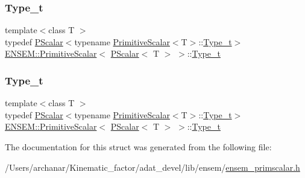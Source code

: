 \subsubsection{\texorpdfstring{Type\_t}{Type\_t}\hspace{0.1cm}{\footnotesize\ttfamily [1/2]}}
{\footnotesize\ttfamily template$<$class T $>$ \\
typedef \mbox{\hyperlink{classENSEM_1_1PScalar}{P\+Scalar}}$<$typename \mbox{\hyperlink{structENSEM_1_1PrimitiveScalar}{Primitive\+Scalar}}$<$T$>$\+::\mbox{\hyperlink{structENSEM_1_1PrimitiveScalar_3_01PScalar_3_01T_01_4_01_4_a3b7d612e567079b69a727ff98d74563e}{Type\+\_\+t}}$>$ \mbox{\hyperlink{structENSEM_1_1PrimitiveScalar}{E\+N\+S\+E\+M\+::\+Primitive\+Scalar}}$<$ \mbox{\hyperlink{classENSEM_1_1PScalar}{P\+Scalar}}$<$ T $>$ $>$\+::\mbox{\hyperlink{structENSEM_1_1PrimitiveScalar_3_01PScalar_3_01T_01_4_01_4_a3b7d612e567079b69a727ff98d74563e}{Type\+\_\+t}}}

\mbox{\label{structENSEM_1_1PrimitiveScalar_3_01PScalar_3_01T_01_4_01_4_a3b7d612e567079b69a727ff98d74563e}} 
\subsubsection{\texorpdfstring{Type\_t}{Type\_t}\hspace{0.1cm}{\footnotesize\ttfamily [2/2]}}
{\footnotesize\ttfamily template$<$class T $>$ \\
typedef \mbox{\hyperlink{classENSEM_1_1PScalar}{P\+Scalar}}$<$typename \mbox{\hyperlink{structENSEM_1_1PrimitiveScalar}{Primitive\+Scalar}}$<$T$>$\+::\mbox{\hyperlink{structENSEM_1_1PrimitiveScalar_3_01PScalar_3_01T_01_4_01_4_a3b7d612e567079b69a727ff98d74563e}{Type\+\_\+t}}$>$ \mbox{\hyperlink{structENSEM_1_1PrimitiveScalar}{E\+N\+S\+E\+M\+::\+Primitive\+Scalar}}$<$ \mbox{\hyperlink{classENSEM_1_1PScalar}{P\+Scalar}}$<$ T $>$ $>$\+::\mbox{\hyperlink{structENSEM_1_1PrimitiveScalar_3_01PScalar_3_01T_01_4_01_4_a3b7d612e567079b69a727ff98d74563e}{Type\+\_\+t}}}



The documentation for this struct was generated from the following file\+:\begin{DoxyCompactItemize}
\item 
/\+Users/archanar/\+Kinematic\+\_\+factor/adat\+\_\+devel/lib/ensem/\mbox{\hyperlink{lib_2ensem_2ensem__primscalar_8h}{ensem\+\_\+primscalar.\+h}}\end{DoxyCompactItemize}
